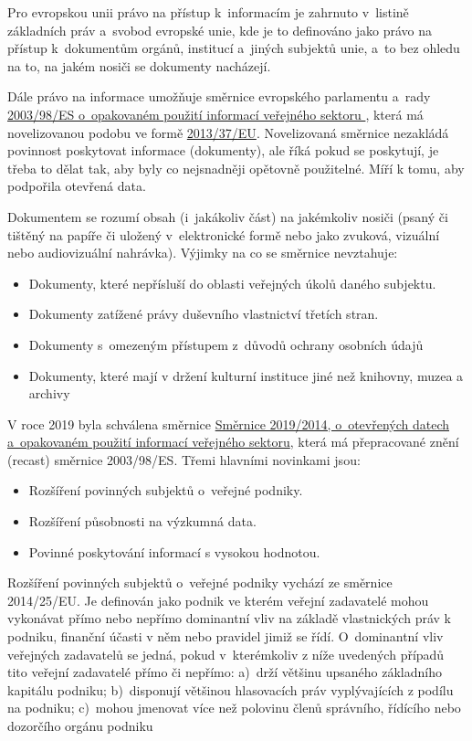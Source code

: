 Pro evropskou unii právo na přístup k~informacím je zahrnuto v~listině základních práv a~svobod evropské unie, kde je to definováno jako právo na přístup k~dokumentům orgánů, institucí a~jiných subjektů unie, a~to bez ohledu na to, na jakém nosiči se dokumenty nacházejí. 

Dále právo na informace umožňuje směrnice evropského parlamentu a~rady \href{https://eur-lex.europa.eu/legal-content/CS/TXT/?uri=celex\%3A32003L0098}{2003/98/ES o~opakovaném použití informací veřejného sektoru }, která má novelizovanou podobu ve formě \href{https://eur-lex.europa.eu/legal-content/EN/TXT/?uri=CELEX\%3A02003L0098-20130717}{2013/37/EU}. Novelizovaná směrnice nezakládá povinnost poskytovat informace (dokumenty), ale říká pokud se poskytují, je třeba to dělat tak, aby byly co nejsnadněji opětovně použitelné. Míří k tomu, aby podpořila otevřená data. 

Dokumentem se rozumí obsah (i~jakákoliv část) na jakémkoliv nosiči (psaný či tištěný na papíře či uložený v~elektronické formě nebo jako zvuková, vizuální nebo audiovizuální nahrávka).
Výjimky na co se směrnice nevztahuje:
\begin{itemize}[noitemsep]
    \item Dokumenty, které nepřísluší do oblasti veřejných úkolů daného subjektu.
    \item Dokumenty zatížené právy duševního vlastnictví třetích stran.
    \item Dokumenty s~omezeným přístupem z~důvodů ochrany osobních údajů
    \item Dokumenty, které mají v držení kulturní instituce jiné než knihovny, muzea a archivy
\end{itemize}

V roce 2019 byla schválena směrnice \href{https://eur-lex.europa.eu/legal-content/CS/TXT/?uri=CELEX:32019L1024}{Směrnice 2019/2014, o~otevřených datech a~opakovaném použití informací veřejného sektoru}, která má přepracované znění (recast) směrnice 2003/98/ES. 
Třemi hlavními novinkami jsou:
\begin{itemize}[noitemsep]
    \item Rozšíření povinných subjektů o~veřejné podniky.
    \item Rozšíření působnosti na výzkumná data.
    \item Povinné poskytování informací s vysokou hodnotou.
\end{itemize}

Rozšíření povinných subjektů o~veřejné podniky vychází ze směrnice 2014/25/EU. Je definován jako podnik ve kterém veřejní zadavatelé mohou vykonávat přímo nebo nepřímo dominantní vliv na základě vlastnických práv k podniku, finanční účasti v něm nebo pravidel jimiž se řídí. O~dominantní vliv veřejných zadavatelů se jedná, pokud v~kterémkoliv z níže uvedených případů tito veřejní zadavatelé přímo či nepřímo: a)~drží většinu upsaného základního kapitálu podniku; b)~disponují většinou hlasovacích práv vyplývajících z podílu na podniku; c)~mohou jmenovat více než polovinu členů správního, řídícího nebo dozorčího orgánu podniku

